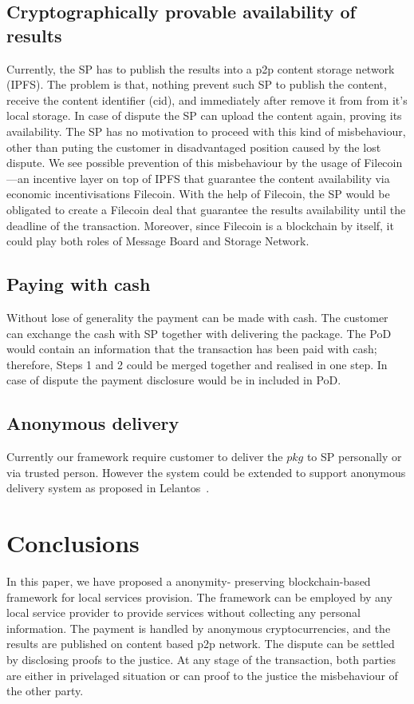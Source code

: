 \documentclass{ieeeaccess}
\begin{document}
\subsection{Cryptographically provable availability of
results}\label{cryptographically-provable-availability-of-results}

Currently, the SP has to publish the results into a p2p content storage
network (IPFS). The problem is that, nothing prevent such SP to publish
the content, receive the content identifier (cid), and immediately after
remove it from from it's local storage. In case of dispute the SP can
upload the content again, proving its availability. The SP has no
motivation to proceed with this kind of misbehaviour, other than puting
the customer in disadvantaged position caused by the lost dispute. We see
possible prevention of this misbehaviour by the usage of Filecoin---an
incentive layer on top of IPFS that guarantee the content availability
via economic incentivisations Filecoin\cite{benetfilecoin}. With the
help of Filecoin, the SP would be obligated to create a Filecoin deal
that guarantee the results availability until the deadline of the
transaction. Moreover, since Filecoin is a blockchain by itself, it
could play both roles of Message Board and Storage Network.

\subsection{Paying with cash}\label{paying-with-cash}

Without lose of generality the payment can be made with cash. The
customer can exchange the cash with SP together with delivering the
package. The PoD would contain an information that the
transaction has been paid with cash; therefore, Steps 1 and 2 could be
merged together and realised in one step. In case of dispute the payment
disclosure would be in included in PoD.

\subsection{Anonymous delivery}\label{anonymous-delivery}

Currently our framework require customer to deliver the \(pkg\) to SP
personally or via trusted person. However the system could be extended
to support anonymous delivery system as proposed in
Lelantos~\cite{altawy2017lelantos}.

\section{Conclusions}
In this paper, we have proposed a anonymity- preserving blockchain-based framework for local services provision. The framework can be employed by any local service provider to provide services without collecting any personal information. The payment is handled by anonymous cryptocurrencies, and the results are published on content based p2p network. The dispute can be settled by disclosing proofs to the justice. At any stage of the transaction, both parties are either in privelaged situation or can proof to the justice the misbehaviour of the other party.



\EOD
\end{document}
